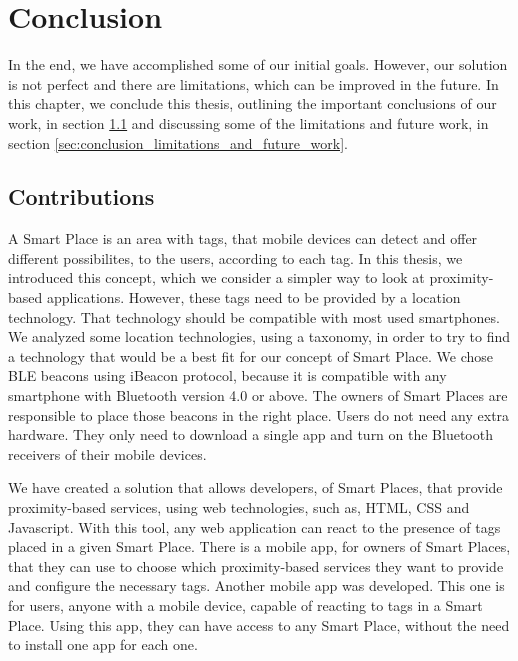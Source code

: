 
\chapter{Conclusion}
\label{chapter:conclusion}
In the end, we have accomplished some of our initial goals.
However, our solution is not perfect and there are limitations, which can be improved in the future.
In this chapter, we conclude this thesis, outlining the important conclusions of our work, in section \ref{sec:conclusion_contributions} and discussing some of the limitations and future work, in section \ref{sec:conclusion_limitations_and_future_work}.

\section{Contributions}
\label{sec:conclusion_contributions}
A Smart Place is an area with tags, that mobile devices can detect and offer different possibilites, to the users, according to each tag.
In this thesis, we introduced this concept, which we consider a simpler way to look at proximity-based applications.
However, these tags need to be provided by a location technology.
That technology should be compatible with most used smartphones.
We analyzed some location technologies, using a taxonomy\cite{location}, in order to try to find a technology that would be a best fit for our concept of Smart Place.
We chose \gls{BLE} beacons using iBeacon protocol, because it is compatible with any smartphone with Bluetooth version 4.0 or above.
The owners of Smart Places are responsible to place those beacons in the right place.
Users do not need any extra hardware.
They only need to download a single app and turn on the Bluetooth receivers of their mobile devices.

We have created a solution that allows developers, of Smart Places, that provide proximity-based services, using web technologies, such as, \gls{HTML}, \gls{CSS} and Javascript.
With this tool, any web application can react to the presence of tags placed in a given Smart Place.
There is a mobile app, for owners of Smart Places, that they can use to choose which proximity-based services they want to provide and configure the necessary tags.
Another mobile app was developed.
This one is for users, anyone with a mobile device, capable of reacting to tags in a Smart Place.
Using this app, they can have access to any Smart Place, without the need to install one app for each one.

